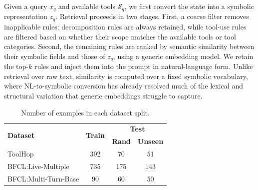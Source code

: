 \documentclass[11pt]{article}
\begin{document}
Given a query \( x_q \) and available tools \( \mathcal{S}_q \), we first convert the state into a symbolic representation \( z_q \). Retrieval proceeds in two stages. First, a coarse filter removes inapplicable rules: decomposition rules are always retained, while tool-use rules are filtered based on whether their scope matches the available tools or tool categories. Second, the remaining rules are ranked by semantic similarity between their symbolic fields and those of \( z_q \), using a generic embedding model. We retain the top-$k$ rules and inject them into the prompt in natural-language form. Unlike retrieval over raw text, similarity is computed over a fixed symbolic vocabulary, where NL-to-symbolic conversion has already resolved much of the lexical and structural variation that generic embeddings struggle to capture.





\begin{table}[h]
\small
\caption{Number of examples in each dataset split.}
\vspace{0.5em}
\label{tab:dataset}
\centering
\renewcommand{\arraystretch}{1.25}
\begin{tabular}{@{}l|c|cc@{}}
\toprule
\multirow{2}{*}{\textbf{Dataset}} & 
\multirow{2}{*}{\textbf{Train}} & 
\multicolumn{2}{c}{\textbf{Test}} \\
 &  & \textbf{Rand} & \textbf{Unseen} \\
\midrule
ToolHop & 392 & 70 & 51 \\
BFCL:Live-Multiple & 735 & 175 & 143 \\
BFCL:Multi-Turn-Base & 90 & 60 & 50 \\
\bottomrule
\end{tabular}
\end{table}

\end{document}
